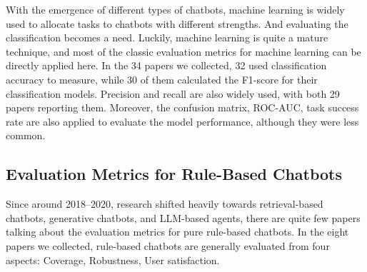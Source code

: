 \documentclass[12pt,a4paper]{article}
\begin{document}
With the emergence of different types of chatbots, machine learning is widely used to allocate tasks to chatbots with different strengths. And evaluating the classification becomes a need. Luckily, machine learning is quite a mature technique, and most of the classic evaluation metrics for machine learning can be directly applied here. In the 34 papers we collected, 32 used classification accuracy to measure, while 30 of them calculated the F1-score for their classification models. Precision and recall are also widely used, with both 29 papers reporting them. Moreover, the confusion matrix, ROC-AUC, task success rate are also applied to evaluate the model performance, although they were less common.

\subsection{Evaluation Metrics for Rule-Based Chatbots}

Since around 2018--2020, research shifted heavily towards retrieval-based chatbots, generative chatbots, and LLM-based agents, there are quite few papers talking about the evaluation metrics for pure rule-based chatbots. In the eight papers we collected, rule-based chatbots are generally evaluated from four aspects: Coverage, Robustness, User satisfaction.
\end{document}
